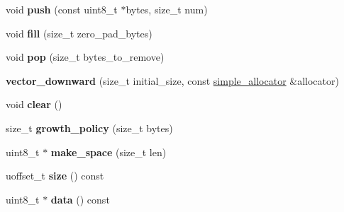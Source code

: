 \begin{DoxyCompactItemize}
\item 
\mbox{\label{classflatbuffers_1_1vector__downward_a8cfd1b66f93043acb9905519e9998ced}} 
void {\bfseries push} (const uint8\+\_\+t $\ast$bytes, size\+\_\+t num)
\item 
\mbox{\label{classflatbuffers_1_1vector__downward_a692f950a105db47f983ff80d4e5c3772}} 
void {\bfseries fill} (size\+\_\+t zero\+\_\+pad\+\_\+bytes)
\item 
\mbox{\label{classflatbuffers_1_1vector__downward_a23cd3d0692fe86eacc6324ea4b58a599}} 
void {\bfseries pop} (size\+\_\+t bytes\+\_\+to\+\_\+remove)
\item 
\mbox{\label{classflatbuffers_1_1vector__downward_a0f044a6fcdd12b2c6bc92224b3abeede}} 
{\bfseries vector\+\_\+downward} (size\+\_\+t initial\+\_\+size, const \hyperlink{classflatbuffers_1_1simple__allocator}{simple\+\_\+allocator} \&allocator)
\item 
\mbox{\label{classflatbuffers_1_1vector__downward_ae701e8e1cc468d1a3141e0fa22dc3a70}} 
void {\bfseries clear} ()
\item 
\mbox{\label{classflatbuffers_1_1vector__downward_a00f9fca894e2a2963ae0867ff443d0c2}} 
size\+\_\+t {\bfseries growth\+\_\+policy} (size\+\_\+t bytes)
\item 
\mbox{\label{classflatbuffers_1_1vector__downward_a4a0686bb0afe2feefec0502f527a11bf}} 
uint8\+\_\+t $\ast$ {\bfseries make\+\_\+space} (size\+\_\+t len)
\item 
\mbox{\label{classflatbuffers_1_1vector__downward_a70c8de02d393caddcedde603a5a45ae7}} 
uoffset\+\_\+t {\bfseries size} () const
\item 
\mbox{\label{classflatbuffers_1_1vector__downward_aa1f13e25b0c619ba9a9c2d6b408e2587}} 
uint8\+\_\+t $\ast$ {\bfseries data} () const
\item 

\end{DoxyCompactItemize}
